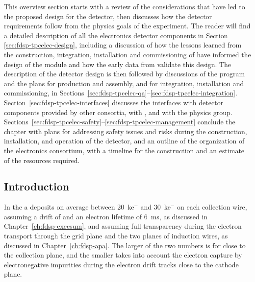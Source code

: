 This overview section starts with a review of the considerations that
have led to the proposed design for the   detector, 
then discusses how the detector requirements follow from the physics goals 
of the experiment. The reader will find a detailed description of all the 
 electronics detector components in Section \ref{sec:fdsp-tpcelec-design},
including a discussion of how the lessons learned from the construction,
integration, installation and commissioning of  have informed
the design of the   module and how the early data
from  validate this design. The description of the detector
design is then followed by discussions 
of the  program and the plans for production and assembly, 
and for integration, installation and commissioning, in 
Sections~\ref{sec:fdsp-tpcelec-qa}--\ref{sec:fdsp-tpcelec-integration}. 
Section~\ref{sec:fdsp-tpcelec-interfaces} discusses the interfaces with 
detector components provided by other consortia, with , and with the physics group. 
Sections~\ref{sec:fdsp-tpcelec-safety}--\ref{sec:fdsp-tpcelec-management} 
conclude the chapter with plans for addressing safety issues and risks during the
construction, installation, and operation of the detector, and 
an outline of the organization of the  electronics consortium, 
with a timeline for the  construction and an estimate
of the resources required.

\subsection{Introduction}
\label{sec:fdsp-tpcelec-overview-intro}

In the   a  deposits on average between
\SI{20}{k}{e$^-$} and \SI{30}{k}{e$^-$} on each collection wire, assuming a drift \efield
of \spmaxfield and an electron lifetime of \SI{6}{ms}, as discussed in
Chapter~\ref{ch:fdsp-execsum}, and assuming full transparency during the 
electron transport through the grid plane and the two planes of induction
wires, as discussed in Chapter~\ref{ch:fdsp-apa}. The larger of the two numbers 
is for  close to the collection plane, and the smaller
takes into account the electron capture by electronegative impurities during the electron
drift tracks close to the cathode plane. 


